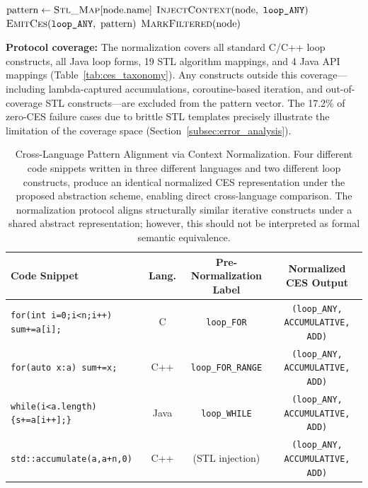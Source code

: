 \begin{algorithm}[t]
\caption{STL Call Injection Protocol}
\label{alg:stl_injection}
\begin{algorithmic}[1]
                \State $\text{pattern} \leftarrow \textsc{Stl\_Map}[\text{node.name}]$
                \State $\textsc{InjectContext}(\text{node},\ \texttt{loop\_ANY})$
                \State $\textsc{EmitCes}(\texttt{loop\_ANY},\ \text{pattern})$
            \Else
                \State $\textsc{MarkFiltered}(\text{node})$
            \EndIf
        \EndIf
    \EndFor
\end{algorithmic}
\end{algorithm}

\textbf{Protocol coverage:} The normalization covers all standard C/C++ loop constructs, all Java loop forms, 19 STL algorithm mappings, and 4 Java API mappings (Table~\ref{tab:ces_taxonomy}). Any constructs outside this coverage---including lambda-captured accumulations, coroutine-based iteration, and out-of-coverage STL constructs---are excluded from the pattern vector. The 17.2\% of zero-CES failure cases due to brittle STL templates precisely illustrate the limitation of the coverage space (Section~\ref{subsec:error_analysis}).

\begin{table}[t]
\caption{Cross-Language Pattern Alignment via Context Normalization. Four different code snippets written in three different languages and two different loop constructs, produce an identical normalized CES representation under the proposed abstraction scheme, enabling direct cross-language comparison. The normalization protocol aligns structurally similar iterative constructs under a shared abstract representation; however, this should not be interpreted as formal semantic equivalence.}
\label{tab:context_norm_illustration}
\centering
\begin{tabular}{|l|c|c|c|}
\hline
\textbf{Code Snippet} & \textbf{Lang.} & \textbf{Pre-Normalization Label} & \textbf{Normalized CES Output} \\
\hline
\texttt{for(int i=0;i<n;i++) sum+=a[i];} & C    & \texttt{loop\_FOR}        & \texttt{(loop\_ANY, ACCUMULATIVE, ADD)} \\
\hline
\texttt{for(auto x:a) sum+=x;}           & C++  & \texttt{loop\_FOR\_RANGE}  & \texttt{(loop\_ANY, ACCUMULATIVE, ADD)} \\
\hline
\texttt{while(i<a.length)\{s+=a[i++];\}} & Java & \texttt{loop\_WHILE}      & \texttt{(loop\_ANY, ACCUMULATIVE, ADD)} \\
\hline
\texttt{std::accumulate(a,a+n,0)}        & C++  & (STL injection)            & \texttt{(loop\_ANY, ACCUMULATIVE, ADD)} \\
\hline
\end{tabular}
\end{table}

